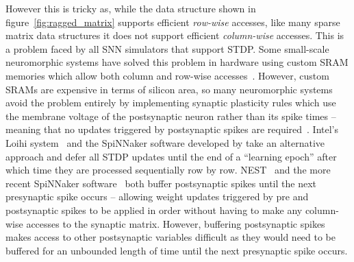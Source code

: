 \documentclass[utf8]{frontiersSCNS} %
\begin{document}
However this is tricky as, while the data structure shown in figure~\ref{fig:ragged_matrix} supports efficient \textit{row-wise} accesses, like many sparse matrix data structures it does not support efficient \textit{column-wise} accesses.
This is a problem faced by all SNN simulators that support STDP.
Some small-scale neuromorphic systems have solved this problem in hardware using custom SRAM memories which allow both column and row-wise accesses~\citep{Seo2011}.
However, custom SRAMs are expensive in terms of silicon area, so many neuromorphic systems avoid the problem entirely by implementing synaptic plasticity rules which use the membrane voltage of the postsynaptic neuron rather than its spike times -- meaning that no updates triggered by postsynaptic spikes are required~\citep{Frenkel2018,Qiao2015}.
Intel's Loihi system~\citep{Davies2018} and the SpiNNaker software developed by \citet{Galluppi2014a} take an alternative approach and defer all STDP updates until the end of a ``learning epoch'' after which time they are processed sequentially row by row.
NEST~\citep{Morrison2007} and the more recent SpiNNaker software~\citep{Knight2016} both buffer postsynaptic spikes until the next presynaptic spike occurs -- allowing weight updates triggered by pre and postsynaptic spikes to be applied in order without having to make any column-wise accesses to the synaptic matrix. 
However, buffering postsynaptic spikes makes access to other postsynaptic variables difficult as they would need to be buffered for an unbounded length of time until the next presynaptic spike occurs.
\end{document}
